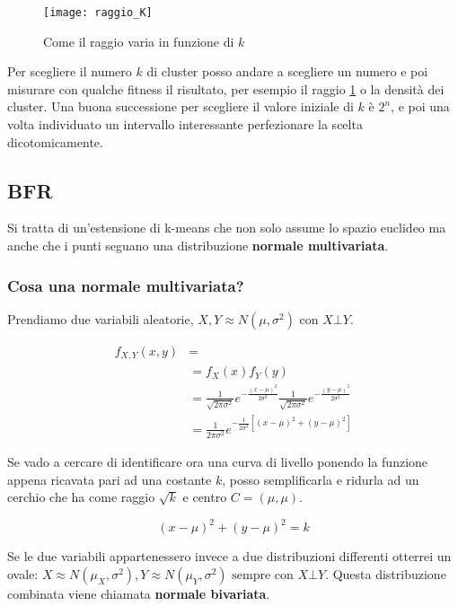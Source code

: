 \documentclass[\main/main.tex]{subfiles}
\begin{document}
\begin{figure}
  \texttt{[image: raggio\_K]}
  \caption{Come il raggio varia in funzione di $k$}
  \label{fig:raggio}
\end{figure}

Per scegliere il numero $k$ di cluster posso andare a scegliere un numero e poi misurare con qualche fitness il risultato, per esempio il raggio \ref{fig:raggio} o la densità dei cluster. Una buona successione per scegliere il valore iniziale di $k$ è $2^n$, e poi una volta individuato un intervallo interessante perfezionare la scelta dicotomicamente.

\subsection{BFR}
Si tratta di un'estensione di k-means che non solo assume lo spazio euclideo ma anche che i punti seguano una distribuzione \textbf{normale multivariata}.

\subsubsection{Cosa  una normale multivariata?}
Prendiamo due variabili aleatorie, $X,Y \approx N(\mu, \sigma^2) \text{ con } X\bot Y$.

\begin{align}
  f_{X,Y} (x,y) & =                                                                                                                                     \\
                & =f_X (x) f_Y(y)                                                                                                                       \\
                & = \frac{1}{\sqrt{2 \pi \sigma^2}} e^{- \frac{(x-\mu)^2}{2\sigma^2}} \frac{1}{\sqrt{2 \pi \sigma^2}} e^{- \frac{(y-\mu)^2}{2\sigma^2}} \\
                & = \frac{1}{2 \pi \sigma^2} e^{-\frac{1}{2\sigma^2}[(x-\mu)^2+(y-\mu)^2]}
\end{align}

Se vado a cercare di identificare ora una curva di livello ponendo la funzione appena ricavata pari ad una costante $k$, posso semplificarla e ridurla ad un cerchio che ha come raggio $\sqrt{k}$ e centro $C = (\mu,\mu)$.

\[
  (x-\mu)^2 + (y-\mu)^2 = k
\]

Se le due variabili appartenessero invece a due distribuzioni differenti otterrei un ovale: $X \approx N(\mu_X, \sigma^2), Y \approx N(\mu_Y, \sigma^2) \text{ sempre con } X\bot Y$. Questa distribuzione combinata viene chiamata \textbf{normale bivariata}.
\end{document}
